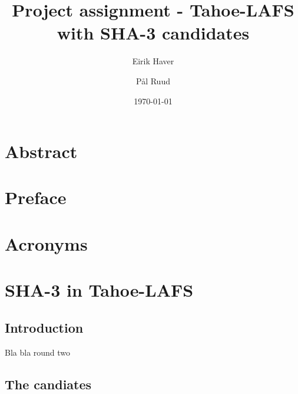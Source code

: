 \documentclass[english,12pt,a4paper,twoside]{report}
\author{Eirik Haver \and Pål Ruud}
\title{Project assignment - Tahoe-LAFS with SHA-3 candidates}
\date{\today}
\newcommand{\ensureodd}{
    \newpage
    \mbox{}
}
\begin{document}



\ensureodd
\chapter*{Abstract}

\ensureodd
\chapter*{Preface}

\tableofcontents
\cleardoublepage

\listoffigures
\cleardoublepage

\listoftables
\cleardoublepage

\chapter*{Acronyms}


\cleardoublepage

\chapter{SHA-3 in Tahoe-LAFS}
\setcounter{page}{1}

\section{Introduction}

Bla bla round two \cite{nistround2}

\section{The candiates}




\appendix
\appendixpage
\addappheadtotoc

\end{document}

